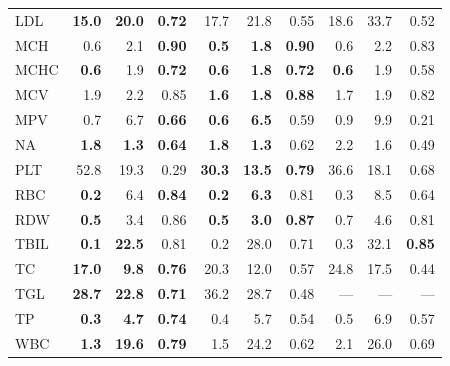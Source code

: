 \begin{table}[ht]
\begin{tabular}{lrrrrrrrrr}
LDL & \textbf{15.0} & \textbf{20.0} & \textbf{0.72} & 17.7 & 21.8 & 0.55 & 18.6 & 33.7 & 0.52 \\
MCH & 0.6 & 2.1 & \textbf{0.90} & \textbf{0.5} & \textbf{1.8} & \textbf{0.90} & 0.6 & 2.2 & 0.83 \\
MCHC & \textbf{0.6} & 1.9 & \textbf{0.72} & \textbf{0.6} & \textbf{1.8} & \textbf{0.72} & \textbf{0.6} & 1.9 & 0.58 \\
MCV & 1.9 & 2.2 & 0.85 & \textbf{1.6} & \textbf{1.8} & \textbf{0.88} & 1.7 & 1.9 & 0.82 \\
MPV & 0.7 & 6.7 & \textbf{0.66} & \textbf{0.6} & \textbf{6.5} & 0.59 & 0.9 & 9.9 & 0.21 \\
NA & \textbf{1.8} & \textbf{1.3} & \textbf{0.64} & \textbf{1.8} & \textbf{1.3} & 0.62 & 2.2 & 1.6 & 0.49 \\
PLT & 52.8 & 19.3 & 0.29 & \textbf{30.3} & \textbf{13.5} & \textbf{0.79} & 36.6 & 18.1 & 0.68 \\
RBC & \textbf{0.2} & 6.4 & \textbf{0.84} & \textbf{0.2} & \textbf{6.3} & 0.81 & 0.3 & 8.5 & 0.64 \\
RDW & \textbf{0.5} & 3.4 & 0.86 & \textbf{0.5} & \textbf{3.0} & \textbf{0.87} & 0.7 & 4.6 & 0.81 \\
TBIL & \textbf{0.1} & \textbf{22.5} & 0.81 & 0.2 & 28.0 & 0.71 & 0.3 & 32.1 & \textbf{0.85} \\
TC & \textbf{17.0} & \textbf{9.8} & \textbf{0.76} & 20.3 & 12.0 & 0.57 & 24.8 & 17.5 & 0.44 \\
TGL & \textbf{28.7} & \textbf{22.8} & \textbf{0.71} & 36.2 & 28.7 & 0.48 & --- & --- & --- \\
TP & \textbf{0.3} & \textbf{4.7} & \textbf{0.74} & 0.4 & 5.7 & 0.54 & 0.5 & 6.9 & 0.57 \\
WBC & \textbf{1.3} & \textbf{19.6} & \textbf{0.79} & 1.5 & 24.2 & 0.62 & 2.1 & 26.0 & 0.69 \\
\bottomrule
\end{tabular}
\label{tab:analyte_performance}
\end{table}